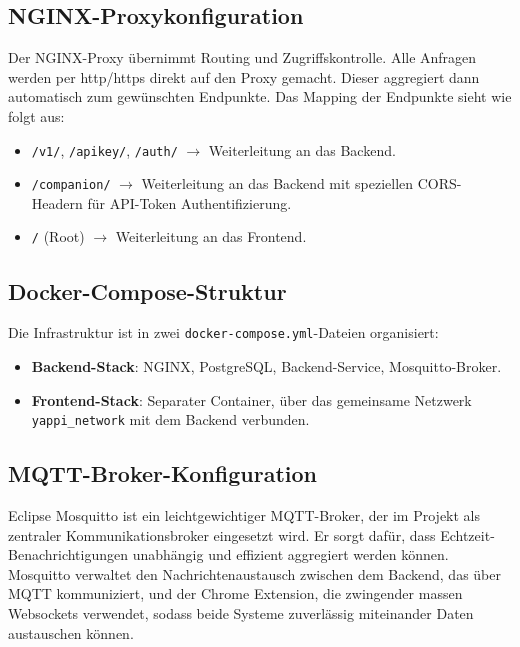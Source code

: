 \documentclass[12pt,a4paper]{report}
\begin{document}
    \subsection{NGINX-Proxykonfiguration}

        Der NGINX-Proxy übernimmt Routing und Zugriffskontrolle. Alle Anfragen werden per http/https direkt auf den Proxy gemacht.
        Dieser aggregiert dann automatisch zum gewünschten Endpunkte. Das Mapping der Endpunkte sieht wie folgt aus:

        \begin{itemize}
            \item \texttt{/v1/}, \texttt{/apikey/}, \texttt{/auth/} $\rightarrow$ Weiterleitung an das Backend.
            \item \texttt{/companion/} $\rightarrow$ Weiterleitung an das Backend mit speziellen CORS-Headern für API-Token Authentifizierung.
            \item \texttt{/} (Root) $\rightarrow$ Weiterleitung an das Frontend.
        \end{itemize}

    \subsection{Docker-Compose-Struktur}

    Die Infrastruktur ist in zwei \texttt{docker-compose.yml}-Dateien organisiert:

    \begin{itemize}
        \item \textbf{Backend-Stack}: NGINX, PostgreSQL, Backend-Service, Mosquitto-Broker.
        \item \textbf{Frontend-Stack}: Separater Container, über das gemeinsame Netzwerk \texttt{yappi\_network} mit dem Backend verbunden.
    \end{itemize}

    \subsection{MQTT-Broker-Konfiguration}

    Eclipse Mosquitto ist ein leichtgewichtiger MQTT-Broker, der im Projekt als zentraler Kommunikationsbroker eingesetzt wird.
    Er sorgt dafür, dass Echtzeit-Benachrichtigungen unabhängig und effizient aggregiert werden können.
    Mosquitto verwaltet den Nachrichtenaustausch zwischen dem Backend, das über MQTT kommuniziert, und der Chrome Extension, die zwingender massen Websockets verwendet,
    sodass beide Systeme zuverlässig miteinander Daten austauschen können.
\end{document}
